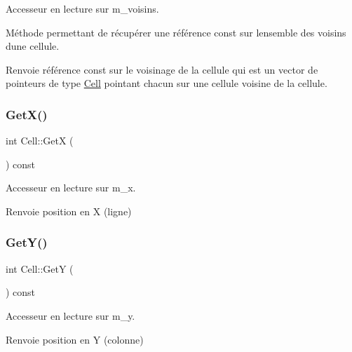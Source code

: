 Accesseur en lecture sur m\+\_\+voisins. 

Méthode permettant de récupérer une référence const sur l\textquotesingle{}ensemble des voisins d\textquotesingle{}une cellule. \begin{DoxyReturn}{Renvoie}
référence const sur le voisinage de la cellule qui est un vector de pointeurs de type \mbox{\hyperlink{class_cell}{Cell}} pointant chacun sur une cellule voisine de la cellule. 
\end{DoxyReturn}
\mbox{\label{class_cell_a3af5ea9b9e031151e16009b22118b07a}} 
\subsubsection{\texorpdfstring{Get\+X()}{GetX()}}
{\footnotesize\ttfamily int Cell\+::\+GetX (\begin{DoxyParamCaption}{ }\end{DoxyParamCaption}) const\hspace{0.3cm}{\ttfamily [inline]}}



Accesseur en lecture sur m\+\_\+x. 

\begin{DoxyReturn}{Renvoie}
position en X (ligne) 
\end{DoxyReturn}
\mbox{\label{class_cell_a3668c9664cadb1b94a632d497fa493c5}} 
\subsubsection{\texorpdfstring{Get\+Y()}{GetY()}}
{\footnotesize\ttfamily int Cell\+::\+GetY (\begin{DoxyParamCaption}{ }\end{DoxyParamCaption}) const\hspace{0.3cm}{\ttfamily [inline]}}



Accesseur en lecture sur m\+\_\+y. 

\begin{DoxyReturn}{Renvoie}
position en Y (colonne) 
\end{DoxyReturn}
\mbox{\label{class_cell_ac1f905d4cd626cc32963ab7a6f76634e}} 
